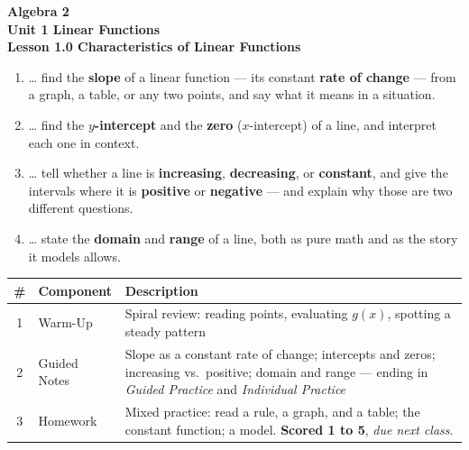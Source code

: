 \documentclass[10pt]{article}
\begin{document}
\vspace{-0.8in}

\begin{center}
  {\color{white}\textbf{\LARGE Algebra 2}}\\[4pt]
  {\color{forestmid}\large\textbf{Unit 1 \quad Linear Functions}}\\[6pt]
  {\color{white}\textbf{\large Lesson 1.0 \quad Characteristics of Linear Functions}}
\end{center}

\vspace{0.22in}
\namedateperiod
\vspace{0.18in}

\begin{learningtargetbox}
\small
\begin{enumerate}[leftmargin=1.5em, itemsep=5pt]
  \item \ldots{} find the \textbf{slope} of a linear function --- its constant \textbf{rate of
        change} --- from a graph, a table, or any two points, and say what it means in a situation.
  \item \ldots{} find the \textbf{$y$-intercept} and the \textbf{zero} ($x$-intercept) of a line,
        and interpret each one in context.
  \item \ldots{} tell whether a line is \textbf{increasing}, \textbf{decreasing}, or
        \textbf{constant}, and give the intervals where it is \textbf{positive} or
        \textbf{negative} --- and explain why those are two different questions.
  \item \ldots{} state the \textbf{domain} and \textbf{range} of a line, both as pure math and as
        the story it models allows.
\end{enumerate}
\end{learningtargetbox}

\vspace{0.14in}

\begin{tocbox}
\small
\renewcommand{\arraystretch}{1.5}
\begin{tabularx}{\linewidth}{@{} c l X @{}}
\rowcolor{forestbg}
\textbf{\#} & \textbf{Component} & \textbf{Description} \\
\midrule
1 & Warm-Up        & Spiral review: reading points, evaluating $g(x)$, spotting a steady pattern \\
2 & Guided Notes   & Slope as a constant rate of change; intercepts and zeros; increasing vs.\
                     positive; domain and range --- ending in \emph{Guided Practice} and
                     \emph{Individual Practice} \\
3 & Homework       & Mixed practice: read a rule, a graph, and a table; the constant function;
                     a model. \textbf{Scored 1 to 5}, \emph{due next class}. \\
\end{tabularx}
\end{tocbox}
\end{document}
